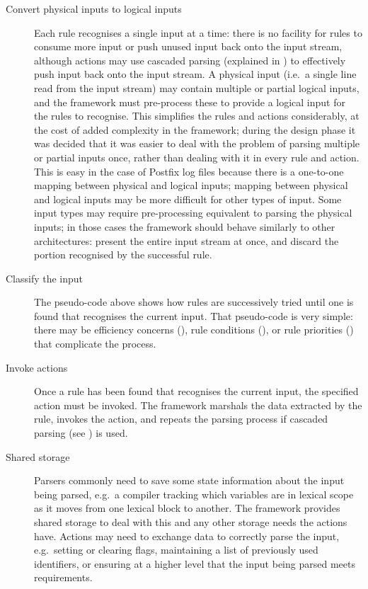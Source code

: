 \begin{description}
    \item [Convert physical inputs to logical inputs] Each rule recognises
        a single input at a time: there is no facility for rules to consume
        more input or push unused input back onto the input stream,
        although actions may use cascaded parsing (explained in
        ) to effectively push input
        back onto the input stream.  A physical input (i.e.\ a single line
        read from the input stream) may contain multiple or partial logical
        inputs, and the framework must pre-process these to provide a
        logical input for the rules to recognise.  This simplifies the
        rules and actions considerably, at the cost of added complexity in
        the framework; during the design phase it was decided that it was
        easier to deal with the problem of parsing multiple or partial
        inputs once, rather than dealing with it in every rule and action.
        This is easy in the case of Postfix log files because there is a
        one-to-one mapping between physical and logical inputs; mapping
        between physical and logical inputs may be more difficult for other
        types of input.  Some input types may require pre-processing
        equivalent to parsing the physical inputs; in those cases the
        framework should behave similarly to other architectures: present
        the entire input stream at once, and discard the portion recognised
        by the successful rule.

    \item [Classify the input]  The pseudo-code above shows how rules are
        successively tried until one is found that recognises the current
        input.  That pseudo-code is very simple: there may be efficiency
        concerns (), rule conditions
        (), or rule priorities
        () that complicate the process.

    \item [Invoke actions]  Once a rule has been found that recognises the
        current input, the specified action must be invoked.  The framework
        marshals the data extracted by the rule, invokes the action, and
        repeats the parsing process if cascaded parsing (see
        ) is used.

    \item [Shared storage]  Parsers commonly need to save some state
        information about the input being parsed, e.g.\ a compiler tracking
        which variables are in lexical scope as it moves from one lexical
        block to another.  The framework provides shared storage to deal
        with this and any other storage needs the actions have.  Actions
        may need to exchange data to correctly parse the input, e.g.\
        setting or clearing flags, maintaining a list of previously used
        identifiers, or ensuring at a higher level that the input being
        parsed meets requirements.


\end{description}

